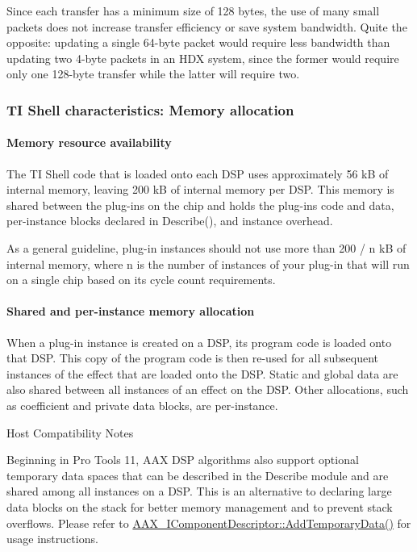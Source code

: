 Since each transfer has a minimum size of 128 bytes, the use of many small packets does not increase transfer efficiency or save system bandwidth. Quite the opposite\+: updating a single 64-\/byte packet would require less bandwidth than updating two 4-\/byte packets in an H\+DX system, since the former would require only one 128-\/byte transfer while the latter will require two.

\hypertarget{a00832_subsection__ti_shell_characteristics_memory_allocation}{}\subsubsection{T\+I Shell characteristics\+: Memory allocation}\label{a00832_subsection__ti_shell_characteristics_memory_allocation}
 \hypertarget{a00832_subsubsection__memory_resource_availability_}{}\paragraph{Memory resource availability}\label{a00832_subsubsection__memory_resource_availability_}
 The TI Shell code that is loaded onto each D\+SP uses approximately 56 kB of internal memory, leaving 200 kB of internal memory per D\+SP. This memory is shared between the plug-\/ins on the chip and holds the plug-\/ins\textquotesingle{} code and data, per-\/instance blocks declared in Describe(), and instance overhead.

As a general guideline, plug-\/in instances should not use more than 200 / n kB of internal memory, where n is the number of instances of your plug-\/in that will run on a single chip based on its cycle count requirements.

\hypertarget{a00832_subsubsection__shared_and_perinstance_memory_allocation_}{}\paragraph{Shared and per-\/instance memory allocation}\label{a00832_subsubsection__shared_and_perinstance_memory_allocation_}
 When a plug-\/in instance is created on a D\+SP, its program code is loaded onto that D\+SP. This copy of the program code is then re-\/used for all subsequent instances of the effect that are loaded onto the D\+SP. Static and global data are also shared between all instances of an effect on the D\+SP. Other allocations, such as coefficient and private data blocks, are per-\/instance.

 \begin{DoxyRefDesc}{Host Compatibility Notes}
\item[\mbox{\hyperlink{a00786__compatibility_notes000023}{Host Compatibility Notes}}]Beginning in Pro Tools 11, A\+AX D\+SP algorithms also support optional temporary data spaces that can be described in the Describe module and are shared among all instances on a D\+SP. This is an alternative to declaring large data blocks on the stack for better memory management and to prevent stack overflows. Please refer to \mbox{\hyperlink{a01781_ad8daad601b60fdbd6134fe0c8faa2fc4}{A\+A\+X\+\_\+\+I\+Component\+Descriptor\+::\+Add\+Temporary\+Data()}} for usage instructions.\end{DoxyRefDesc}


